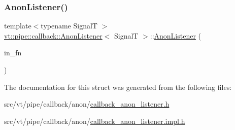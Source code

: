 \mbox{\label{structvt_1_1pipe_1_1callback_1_1_anon_listener_ad7eef759667c0dcff5506ab45e28eda4}} 
\subsubsection{\texorpdfstring{Anon\+Listener()}{AnonListener()}\hspace{0.1cm}{\footnotesize\ttfamily [5/5]}}
{\footnotesize\ttfamily template$<$typename SignalT $>$ \\
\hyperlink{structvt_1_1pipe_1_1callback_1_1_anon_listener}{vt\+::pipe\+::callback\+::\+Anon\+Listener}$<$ SignalT $>$\+::\hyperlink{structvt_1_1pipe_1_1callback_1_1_anon_listener}{Anon\+Listener} (\begin{DoxyParamCaption}\item[{\hyperlink{structvt_1_1pipe_1_1callback_1_1_anon_listener_ad5d8a2cc6a1599642855e92bbd10f89c}{Callback\+Fn\+Type} const \&}]{in\+\_\+fn }\end{DoxyParamCaption})\hspace{0.3cm}{\ttfamily [explicit]}}



The documentation for this struct was generated from the following files\+:\begin{DoxyCompactItemize}
\item 
src/vt/pipe/callback/anon/\hyperlink{callback__anon__listener_8h}{callback\+\_\+anon\+\_\+listener.\+h}\item 
src/vt/pipe/callback/anon/\hyperlink{callback__anon__listener_8impl_8h}{callback\+\_\+anon\+\_\+listener.\+impl.\+h}\end{DoxyCompactItemize}
